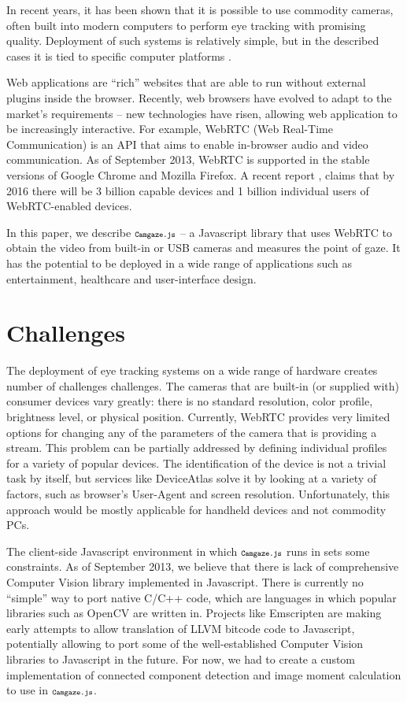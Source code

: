 \documentclass[annual]{acmsiggraph}
\newcommand{\Acronym}[1]{\ensuremath{{\small{\texttt{#1}}}}}
\newcommand{\Name}{\Acronym{Camgaze.js}} \newcommand{\False}{\Constant{false}}
\newcommand{\Constant}[1]{\ensuremath{\small{\texttt{#1}}}}
\begin{document}
In recent years, it has been shown \cite{SanAgustin2009}\cite{Sewell2010}
that it is possible to use commodity cameras, often built into modern
computers to perform eye tracking with promising quality. Deployment of such
systems is relatively simple, but in the described cases it is tied to specific
computer platforms \cite{holland2012eye}.

Web applications are “rich” websites that are able to run without external
plugins inside the browser. Recently, web browsers have evolved to adapt to
the market’s requirements -- new technologies have risen, allowing web
application to be increasingly interactive. For example, WebRTC (Web Real-Time
Communication) is an API that aims to enable in-browser audio and video
communication. As of September 2013, WebRTC is supported in the stable versions
of Google Chrome and Mozilla Firefox. A recent report
\cite{DisruptiveAnalysis2013}, claims that by 2016 there will be
3 billion capable devices and 1 billion individual users of WebRTC-enabled
devices.

In this paper, we describe $\Name$ -- a Javascript library that uses WebRTC to
obtain the video from built-in or USB cameras and measures the point of gaze.
It has the potential to be deployed in a wide range of applications such as
entertainment, healthcare and user-interface design. 



\section{Challenges}

The deployment of eye tracking systems on a wide range of hardware creates
number of challenges challenges.  The cameras that are built-in (or supplied
with) consumer devices vary greatly: there is no standard resolution, color
profile, brightness level, or physical position. Currently, WebRTC provides
very limited options for changing any of the parameters of the camera that is
providing a stream. This problem can be partially addressed by defining
individual profiles for a variety of popular devices. The identification of the
device is not a trivial task by itself, but services like DeviceAtlas
\cite{DeviceAtlas2013} solve it by looking at a variety of factors, such as
browser’s User-Agent and screen resolution.  Unfortunately, this approach would
be mostly applicable for handheld devices and not commodity PCs.

The client-side Javascript environment in which $\Name$ runs in sets some
constraints. As of September 2013, we believe that there is lack of
comprehensive Computer Vision library implemented in Javascript. There is
currently no “simple” way to port native C/C++ code, which are languages in
which popular libraries such as OpenCV are written in. Projects like Emscripten
are making early attempts to allow translation of LLVM bitcode code to
Javascript, potentially allowing to port some of the well-established Computer
Vision libraries to Javascript in the future. For now, we had to create a
custom implementation of connected component detection and image moment
calculation to use in $\Name$.
\end{document}
